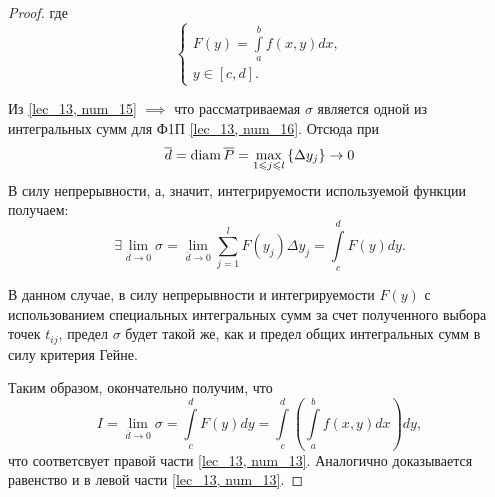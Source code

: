 \documentclass[../../main.tex]{subfiles}
\begin{document}
\begin{proof}
 	где
 	\begin{equation}
 	\label{lec_13, num_16}
 	\begin{cases}
 	F \left( y \right) = \displaystyle
 	\int\limits_a^b f \left( x, y \right) dx, \\
 	y \in \left[ c, d \right]. 
 	\end{cases}
 	\end{equation}
 	
 	Из \eqref{lec_13, num_15} $ \implies $ что рассматриваемая $\sigma$
 	является одной из интегральных сумм для Ф1П  \eqref{lec_13, num_16}.
 	Отсюда при 
 	\[ \overline{d} = \operatorname{diam} \overline{P} = 
 		\underset{1 \leqslant j \leqslant l} {\max} \left\lbrace \Delta y_j \right\rbrace 
 	\to 0 \]
 	В силу непрерывности, а, значит, интегрируемости
 	используемой функции получаем: 
 	\[ \exists \lim\limits_{ \overline{d} \to 0 } \sigma = 
 	\lim\limits_{ \overline{d} \to 0 } 
 	\sum\limits_{j = 1}^l F \left( y_j \right) \Delta y_j =
 	\int\limits_c^d F \left( y \right)dy. \]
 	
 	В данном случае, в силу непрерывности и 
 	интегрируемости $F(y)$ с использованием
 	специальных интегральных сумм за счет полученного 
 	выбора точек $t_{ij}$, предел 
 	$ \sigma $ будет такой же, как и предел общих интегральных сумм 
 	в силу критерия Гейне.
 	
 	Таким образом, окончательно получим, что
 	\[ I = \lim\limits_{ \overline{d} \to 0 } \sigma = 
 	\int\limits_c^d F \left( y \right) dy =
 	\int\limits_c^d \left( \int\limits_a^b 
 	f \left( x, y\right) dx \right) dy, \]
 	что соответсвует правой части \eqref {lec_13, num_13}.
 	Аналогично доказывается равенство и в левой части \eqref {lec_13, num_13}.
\end{proof}
\end{document}

